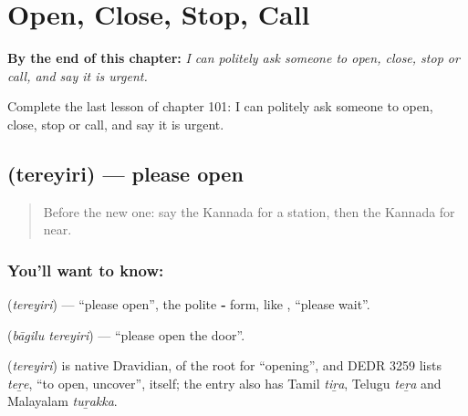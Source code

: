 
\chapter{Open, Close, Stop, Call}
\label{ch:ka-open-close-stop-call}

\begin{chapteropening}
\textbf{By the end of this chapter:} \emph{I can politely ask someone to open, close, stop or call, and say it is urgent.}

Complete the last lesson of chapter 101: I can politely ask someone to open, close, stop or call, and say it is urgent.
\end{chapteropening}

\section[\texorpdfstring{\kn{ತೆರೆಯಿರಿ} (tereyiri)}{ತೆರೆಯಿರಿ (tereyiri)}]{ (tereyiri) — please open}

\label{lesson:KA-C101-open}



\begin{quote}
Before the new one: say the Kannada for a station, then the Kannada for near.
\end{quote}

\subsection*{You'll want to know: }
\textbf{} (\emph{tereyiri}) — \textquotedblleft{}please open\textquotedblright{}, the polite \textbf{‑} form, like \textbf{}, \textquotedblleft{}please wait\textquotedblright{}.

\textbf{ } (\emph{bāgilu tereyiri}) — \textquotedblleft{}please open the door\textquotedblright{}.

\begin{cousinweb}
\textbf{} (\emph{tereyiri}) is native Dravidian, of the root for \textquotedblleft{}opening\textquotedblright{}, and DEDR 3259 lists \emph{teṟe}, \textquotedblleft{}to open, uncover\textquotedblright{}, itself; the entry also has Tamil \emph{tiṟa}, Telugu \emph{teṟa} and Malayalam \emph{tuṟakka}.
\end{cousinweb}

